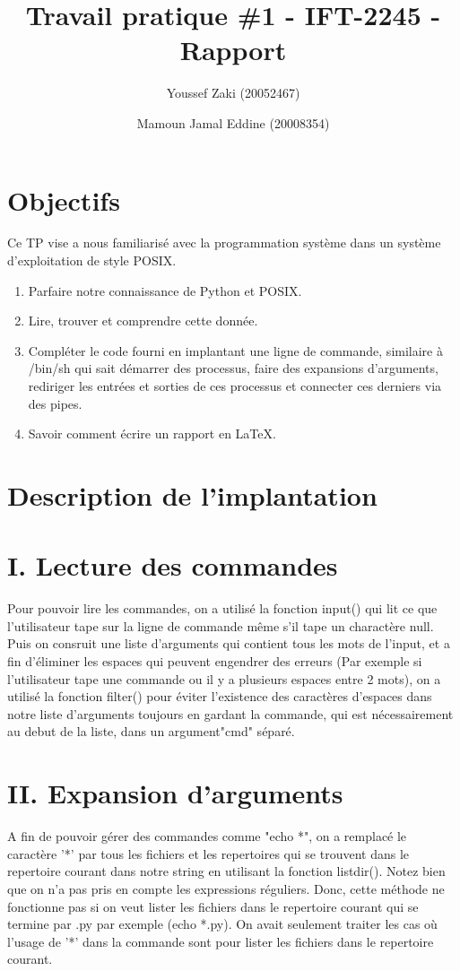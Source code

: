 \documentclass{article}
\title{Travail pratique \#1 - IFT-2245 - Rapport}
\author{Youssef Zaki (20052467) \and Mamoun Jamal Eddine (20008354)}
\begin{document}
\maketitle

\section{Objectifs}

Ce TP vise a nous familiarisé avec la programmation système dans un système 
d'exploitation de style POSIX.

\begin{enumerate}
\item Parfaire notre connaissance de Python et POSIX.
\item Lire, trouver et comprendre cette donnée.
\item Compléter le code fourni en implantant une ligne de commande, similaire 
à /bin/sh qui sait démarrer des processus, faire des expansions d'arguments,
rediriger les entrées et sorties de ces processus et connecter ces derniers 
via des pipes.
\item Savoir comment écrire un rapport en LaTeX.
\end{enumerate}


\section{Description de l'implantation}
\section*{I. Lecture des commandes}
	Pour pouvoir lire les commandes, on a utilisé la fonction input() qui lit ce que l'utilisateur tape sur la ligne de commande même s'il
	tape un charactère null. Puis on consruit une liste d'arguments qui contient tous les mots de l'input, et a fin d'éliminer les espaces qui peuvent engendrer des erreurs (Par exemple si l'utilisateur tape une commande ou il y a plusieurs espaces entre 2 mots), on a utilisé la fonction filter() pour éviter l'existence des caractères d'espaces dans notre liste d'arguments toujours en gardant la commande, qui est nécessairement au debut de la liste, dans un argument"cmd" séparé.

\section*{II. Expansion d'arguments}
	A fin de pouvoir gérer des commandes comme "echo *", on a remplacé le caractère '*' par tous les fichiers et les repertoires qui se trouvent dans le repertoire courant dans notre string en utilisant la fonction listdir(). Notez bien que on n'a pas pris en compte les expressions réguliers. Donc, cette méthode ne fonctionne pas si on veut lister les fichiers dans le repertoire courant qui se termine par .py par exemple (echo *.py). On avait seulement traiter les cas où l'usage de '*' dans la commande sont pour lister les fichiers dans le repertoire courant.
\end{document}
